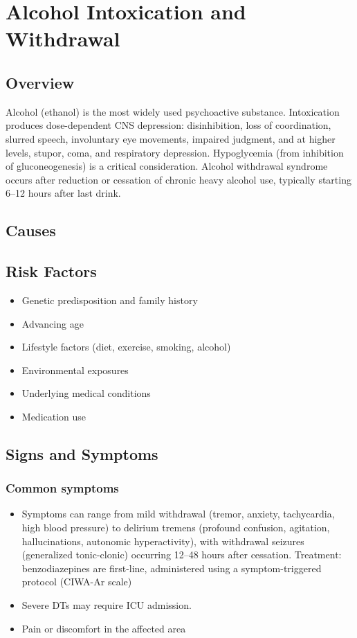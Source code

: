 \chapter{Alcohol Intoxication and Withdrawal}
\label{sec:Alcohol Intoxication and Withdrawal}

\section{Overview}
Alcohol (ethanol) is the most widely used psychoactive substance. Intoxication produces dose-dependent CNS depression: disinhibition, loss of coordination, slurred speech, involuntary eye movements, impaired judgment, and at higher levels, stupor, coma, and respiratory depression. Hypoglycemia (from inhibition of gluconeogenesis) is a critical consideration. Alcohol withdrawal syndrome occurs after reduction or cessation of chronic heavy alcohol use, typically starting 6--12 hours after last drink.
\section{Causes}
\section{Risk Factors}

\begin{itemize}[noitemsep]
  \item Genetic predisposition and family history
  \item Advancing age
  \item Lifestyle factors (diet, exercise, smoking, alcohol)
  \item Environmental exposures
  \item Underlying medical conditions
  \item Medication use
\end{itemize}
\section{Signs and Symptoms}

\subsection{Common symptoms}
\begin{itemize}[noitemsep]
  \item Symptoms can range from mild withdrawal (tremor, anxiety, tachycardia, high blood pressure) to delirium tremens (profound confusion, agitation, hallucinations, autonomic hyperactivity), with withdrawal seizures (generalized tonic-clonic) occurring 12--48 hours after cessation. Treatment: benzodiazepines are first-line, administered using a symptom-triggered protocol (CIWA-Ar scale)
  \item Severe DTs may require ICU admission.
  \item Pain or discomfort in the affected area
  \end{itemize}

